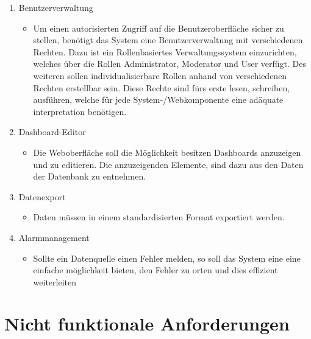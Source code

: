 \begin{enumerate}
\begin{itemize}
    \end{itemize}    
    \item Benutzerverwaltung
    \begin{itemize}
        \item Um einen autorisierten Zugriff auf die Benutzeroberfläche sicher zu stellen, benötigt das System eine Benutzerverwaltung mit verschiedenen Rechten. Dazu ist ein Rollenbasiertes Verwaltungssystem einzurichten, welches über die Rollen Administrator, Moderator und User verfügt. Des weiteren sollen individualisierbare Rollen  anhand von verschiedenen Rechten erstellbar sein. Diese Rechte sind fürs erste lesen, schreiben, ausführen, welche für jede System-/Webkomponente eine adäquate interpretation benötigen. 
    \end{itemize}    
    \item Dashboard-Editor
    \begin{itemize}
        \item Die  Weboberfläche soll die Möglichkeit besitzen Dashboards anzuzeigen und zu editieren. Die anzuzeigenden Elemente, sind dazu aus den Daten der Datenbank zu entnehmen.
    \end{itemize}    
    \item Datenexport
    \begin{itemize}
        \item Daten müssen in einem standardisierten Format exportiert werden.
    \end{itemize}
    \item Alarmmanagement
    \begin{itemize}
        \item Sollte ein Datenquelle einen Fehler melden, so soll das System eine eine einfache möglichkeit bieten, den Fehler zu orten und dies effizient weiterleiten
    \end{itemize}
\end{enumerate}

\section{Nicht funktionale Anforderungen}

